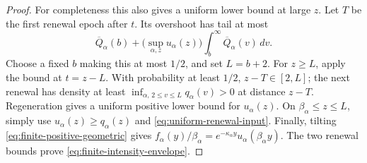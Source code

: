 \documentclass[11pt,letterpaper]{article}
\begin{document}
\begin{proof}
For completeness this also gives a uniform lower bound at large $z$.
Let $T$ be the first renewal epoch after $t$. Its overshoot has tail
at most
\[
 \overline Q_\alpha(b)+
       \bigl(\sup_{\alpha,z}u_\alpha(z)\bigr)
                       \int_b^\infty\overline Q_\alpha(v)\,dv.
\]
Choose a fixed $b$ making this at most $1/2$, and set $L=b+2$.
For $z\ge L$, apply the bound at $t=z-L$.
With probability at least $1/2$, $z-T\in[2,L]$; the next renewal
has density at least $\inf_{\alpha,\,2\le v\le L}q_\alpha(v)>0$
at distance $z-T$. Regeneration gives a uniform positive lower
bound for $u_\alpha(z)$. On $\beta_\alpha\le z\le L$, simply use
$u_\alpha(z)\ge q_\alpha(z)$ and
\eqref{eq:uniform-renewal-input}.
Finally, tilting \eqref{eq:finite-positive-geometric} gives
$f_\alpha(y)/\beta_\alpha
 =e^{-\kappa_\alpha y}u_\alpha(\beta_\alpha y)$.
The two renewal bounds prove \eqref{eq:finite-intensity-envelope}.
\end{proof}
\end{document}
